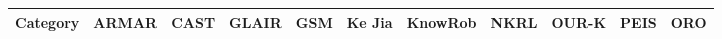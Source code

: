 \begin{landscape}
\begin{table}\tiny
\begin{center}
\begin{tabular}{p{0.2cm}p{3.4cm}p{1.6cm}p{1.3cm}p{1.5cm}p{1.7cm}p{1.5cm}p{2cm}p{1.4cm}p{1.4cm}p{1.4cm}|p{1.4cm}}
\toprule
\multicolumn{2}{c}{\bf Category}                                                     & ARMAR \cite{Holzapfel2008}& CAST \cite{Hawes2007}       & GLAIR \cite{Shapiro2009}    & GSM \cite{Mavridis2006}     & {\sc Ke Jia} \cite{Chen2010}& {\sc KnowRob} \cite{Tenorth2009a}  & NKRL \cite{Sabri2011}           & OUR-K \cite{Lim2011}          & PEIS \cite{Daoutis2009}       & ORO \cite{Lemaignan2010}                      \\
                                                                                                                                                                                                                                                                                                                                                                                                                                
\midrule                                                                                                                                                                                                                                                                                                                                                                                                                        
                                                                                                                                                                                                                                                                                                                                                                                                                                

\end{tabular}
\end{center}
\end{table}
\end{landscape}
